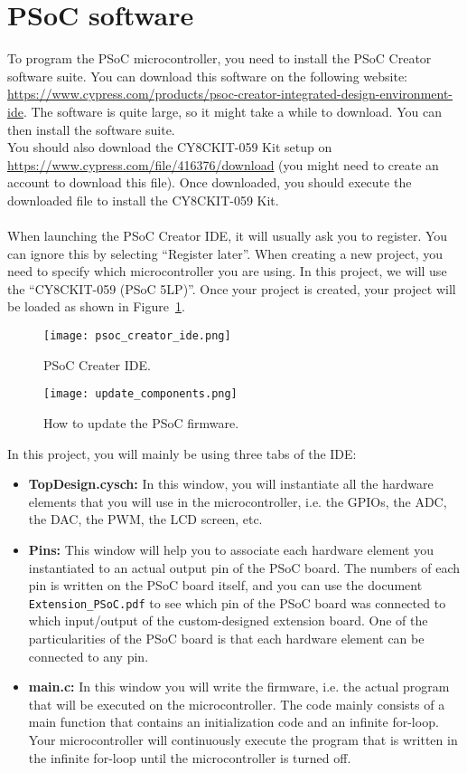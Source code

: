 
\section{PSoC software}
\label{app:software_psoc}

To program the PSoC microcontroller, you need to install the PSoC Creator software suite. You can download this software on the following website: \\
\url{https://www.cypress.com/products/psoc-creator-integrated-design-environment-ide}. The software is quite large, so it might take a while to download. You can then install the software suite. \\
You should also download the CY8CKIT-059 Kit setup on \url{https://www.cypress.com/file/416376/download} (you might need to create an account to download this file). Once downloaded, you should execute the downloaded file to install the CY8CKIT-059 Kit. 
\\
\\
When launching the PSoC Creator IDE, it will usually ask you to register. You can ignore this by selecting ``Register later''. When creating a new project, you need to specify which microcontroller you are using. In this project, we will use the ``CY8CKIT-059 (PSoC 5LP)''. Once your project is created, your project will be loaded as shown in Figure~\ref{fig:psoc_creator_ide}. 
\begin{figure}[h]
	\centering
	\texttt{[image: psoc\_creator\_ide.png]}
	\caption{PSoC Creater IDE. }
	\label{fig:psoc_creator_ide}
\end{figure}
\begin{figure}[h]
	\centering
	\texttt{[image: update\_components.png]}
	\caption{How to update the PSoC firmware. }
	\label{fig:update_components}
\end{figure}

In this project, you will mainly be using three tabs of the IDE: 
\begin{itemize}
	\item \textbf{TopDesign.cysch: } In this window, you will instantiate all the hardware elements that you will use in the microcontroller, i.e. the GPIOs, the ADC, the DAC, the PWM, the LCD screen, etc. 
	\item \textbf{Pins: } This window will help you to associate each hardware element you instantiated to an actual output pin of the PSoC board. The numbers of each pin is written on the PSoC board itself, and you can use the document \texttt{Extension\_PSoC.pdf} to see which pin of the PSoC board was connected to which input/output of the custom-designed extension board. One of the particularities of the PSoC board is that each hardware element can be connected to any pin. 
	\item \textbf{main.c: } In this window you will write the firmware, i.e. the actual program that will be executed on the microcontroller. The code mainly consists of a main function that contains an initialization code and an infinite for-loop. Your microcontroller will continuously execute the program that is written in the infinite for-loop until the microcontroller is turned off.  
\end{itemize}

